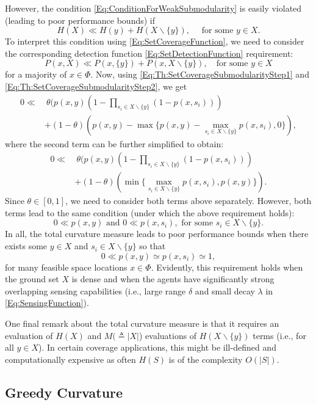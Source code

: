 \documentclass[letterpaper, 10 pt, conference]{ieeeconf}
\begin{document}
However, the condition \eqref{Eq:ConditionForWeakSubmodularity} is easily violated (leading to poor performance bounds) if 
$$
H(X) \ll H(y) + H(X\backslash \{y\}), \quad \mbox{ for some } y\in X. 
$$
To interpret this condition using \eqref{Eq:SetCoverageFunction}, we need to consider the corresponding detection function \eqref{Eq:SetDetectionFunction} requirement: 
$$
P(x,X) \ll P(x,\{y\}) + P(x,X\backslash \{y\}), \quad \mbox{for some } y\in X
$$
for a majority of $x\in\Phi$. Now, using \eqref{Eq:Th:SetCoverageSubmodularityStep1} and \eqref{Eq:Th:SetCoverageSubmodularityStep2}, we get 
\begin{align*}
0\ll&\ \theta(p(x,y)(1-\prod_{s_i\in X\backslash \{y\}}(1-p(x,s_i)))\\
&+(1-\theta) (p(x,y)-\max\{p(x,y)-\max_{s_i\in X\backslash \{y\}}p(x,s_i),0\}),
\end{align*}
where the second term can be further simplified to obtain:
\begin{align*}
0\ll&\ \theta(p(x,y)(1-\prod_{s_i\in X\backslash \{y\}}(1-p(x,s_i)))\\
&+(1-\theta) (\min\{\max_{s_i\in X\backslash \{y\}}p(x,s_i),p(x,y)\}).  
\end{align*}
Since $\theta \in [0,1]$, we need to consider both terms above separately. However, both terms lead to the same condition (under which the above requirement holds):
$$0 \ll p(x,y) \mbox{ and } 0 \ll p(x,s_i), \mbox{ for some } s_i \in X\backslash \{y\}.$$
In all, the total curvature measure leads to poor performance bounds when there exists some $y\in X$ and $s_i\in X\backslash \{y\}$ so that 
$$0\ll p(x,y) \simeq p(x,s_i) \simeq 1,$$
for many feasible space locations $x\in \Phi$. Evidently, this requirement holds when the ground set $X$ is dense and when the agents have significantly strong overlapping sensing capabilities (i.e., large range $\delta$ and small decay $\lambda$ in \eqref{Eq:SensingFunction}).

One final remark about the total curvature measure is that it requires an evaluation of $H(X)$ and $M(\triangleq \vert X\vert$) evaluations of $H(X\backslash \{y\})$ terms (i.e., for all $y\in X$). In certain coverage applications, this might be ill-defined \cite{Sun2020} and computationally expensive as often $H(S)$ is of the complexity $O(\vert S \vert)$.


\subsection{Greedy Curvature \cite{Conforti1984}}
\label{SubSec:GreedyCurvature}
\end{document}
